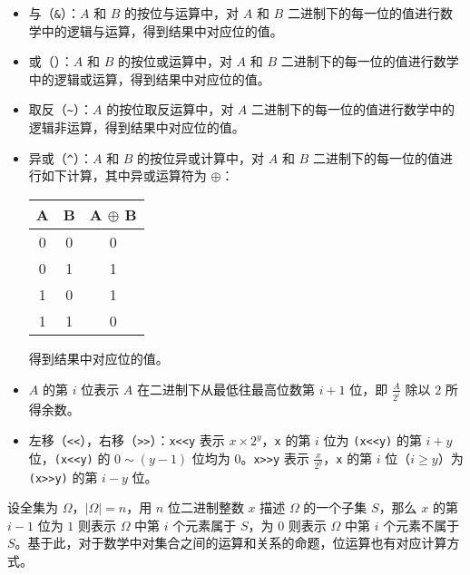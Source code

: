 \begin{itemize}
\item
  与（\texttt{\&}）：\(A\) 和 \(B\) 的按位与运算中，对 \(A\) 和 \(B\)
  二进制下的每一位的值进行数学中的逻辑与运算，得到结果中对应位的值。
\item
  或（\texttt{\textbar{}}）：\(A\) 和 \(B\) 的按位或运算中，对 \(A\) 和
  \(B\)
  二进制下的每一位的值进行数学中的逻辑或运算，得到结果中对应位的值。
\item
  取反（\texttt{\textasciitilde{}}）：\(A\) 的按位取反运算中，对 \(A\)
  二进制下的每一位的值进行数学中的逻辑非运算，得到结果中对应位的值。
\item
  异或（\texttt{\^{}}）：\(A\) 和 \(B\) 的按位异或计算中，对 \(A\) 和
  \(B\) 二进制下的每一位的值进行如下计算，其中异或运算符为  \(\oplus\)：


  \begin{longtable}[]{@{}ccc@{}}
  \toprule
  A & B & A \(\oplus\) B \\
  \midrule
  \endhead
  0 & 0 & 0 \\
  0 & 1 & 1 \\
  1 & 0 & 1 \\
  1 & 1 & 0 \\
  \bottomrule
  \end{longtable}

  得到结果中对应位的值。
\item
  \(A\) 的第 \(i\) 位表示 \(A\) 在二进制下从最低往最高位数第 \(i+1\)
  位，即 \(\frac{A}{2^i}\) 除以 \(2\) 所得余数。
\item
  左移（\texttt{\textless{}\textless{}}），右移（\texttt{\textgreater{}\textgreater{}}）：\texttt{x\textless{}\textless{}y}
  表示 \(x\times 2^y\)，\texttt{x} 的第 \(i\) 位为
  \texttt{(x\textless{}\textless{}y)} 的第 \(i+y\)
  位，\texttt{(x\textless{}\textless{}y)} 的 \(0\sim (y-1)\) 位均为
  \(0\)。\texttt{x\textgreater{}\textgreater{}y} 表示
  \(\frac{x}{2^y}\)，\texttt{x} 的第 \(i\) 位（\(i\ge y\)）为
  \texttt{(x\textgreater{}\textgreater{}y)} 的第 \(i-y\) 位。
\end{itemize}

设全集为 \(\Omega\)，\(|\Omega|=n\)，用 \(n\) 位二进制整数 \(x\) 描述
\(\Omega\) 的一个子集 \(S\)，那么 \(x\) 的第 \(i-1\) 位为 \(1\) 则表示
\(\Omega\) 中第 \(i\) 个元素属于 \(S\)，为 \(0\) 则表示 \(\Omega\) 中第
\(i\) 个元素不属于
\(S\)。基于此，对于数学中对集合之间的运算和关系的命题，位运算也有对应计算方式。

